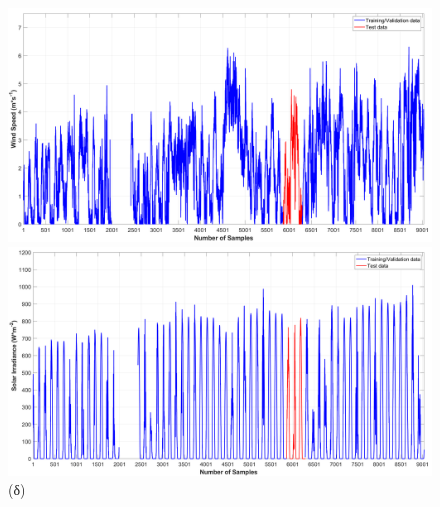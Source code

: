 \documentclass[12pt, a4paper]{report} %
\begin{document}
\begin{figure}[ht]
\begin{adjustwidth}{-1.2cm}{0cm}
        \medskip

        \begin{minipage}[c]{0.48\textwidth}
            \centering
            \includegraphics[scale=0.21]{Figures/NN_WS.png}
            \caption*{\hspace{35pt}(γ)}{}
        \end{minipage}
        \hfill
        \begin{minipage}[c]{0.48\textwidth}
            \centering
            \includegraphics[scale=0.21]{Figures/NN_SR.png}
            \caption*{\hspace{35pt}(δ)}{}
        \end{minipage}

        \medskip


\end{adjustwidth}
\end{figure}
\end{document}
